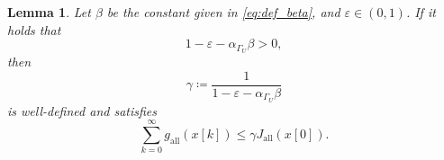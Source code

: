 \documentclass[letterpaper,10pt,conference]{ieeeconf}
\newtheorem{lemma}{Lemma}
\begin{document}
  

\begin{lemma} \label{lem:sum_gall_bound}
  Let $\beta$ be the constant given in \eqref{eq:def_beta}, and $\varepsilon \in (0,1)$.
  If it holds that
  \begin{equation} \label{eq:sigma_condition2}
    1 - \varepsilon - \alpha_{\Gamma_U} \beta > 0,
  \end{equation}
  then
  \begin{equation} \label{eq:def_gamma}
    \gamma \coloneqq \frac{1}{1-\varepsilon-\alpha_{\Gamma_U}\beta}
  \end{equation}
  is well-defined and satisfies
  \begin{equation} \label{eq:gall_sum_bound}
    \sum_{k=0}^\infty g_{\mathrm{all}}(x[k])
    \leq
    \gamma J_{\mathrm{all}}(x[0]).
  \end{equation}
\end{lemma}
\end{document}
